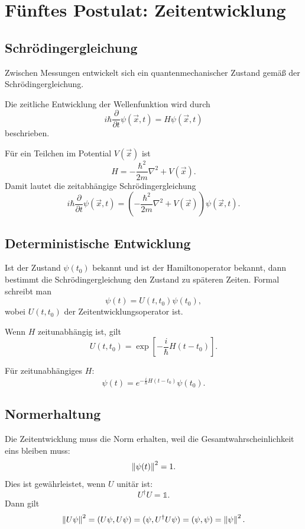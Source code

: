 \section{Fünftes Postulat: Zeitentwicklung}

\subsection{Schrödingergleichung}

Zwischen Messungen entwickelt sich ein quantenmechanischer Zustand gemäß der Schrödingergleichung.

\begin{definitionbox}
Die zeitliche Entwicklung der Wellenfunktion wird durch
\[
    i\hbar\frac{\partial}{\partial t}\psi(\vec{x},t)=H\psi(\vec{x},t)
\]
beschrieben.
\end{definitionbox}

Für ein Teilchen im Potential $V(\vec{x})$ ist
\[
    H=-\frac{\hbar^2}{2m}\nabla^2+V(\vec{x}).
\]
Damit lautet die zeitabhängige Schrödingergleichung
\[
    i\hbar\frac{\partial}{\partial t}\psi(\vec{x},t)
    =\left(-\frac{\hbar^2}{2m}\nabla^2+V(\vec{x})\right)\psi(\vec{x},t).
\]

\subsection{Deterministische Entwicklung}

Ist der Zustand $\psi(t_0)$ bekannt und ist der Hamiltonoperator bekannt, dann bestimmt die Schrödingergleichung den Zustand zu späteren Zeiten. Formal schreibt man
\[
    \psi(t)=U(t,t_0)\psi(t_0),
\]
wobei $U(t,t_0)$ der Zeitentwicklungsoperator ist.

Wenn $H$ zeitunabhängig ist, gilt
\[
    U(t,t_0)=\exp\left[-\frac{i}{\hbar}H(t-t_0)\right].
\]

\begin{formulabox}
Für zeitunabhängiges $H$:
\[
    \psi(t)=e^{-\frac{i}{\hbar}H(t-t_0)}\psi(t_0).
\]
\end{formulabox}

\subsection{Normerhaltung}

Die Zeitentwicklung muss die Norm erhalten, weil die Gesamtwahrscheinlichkeit eins bleiben muss:
\[
    \left\lVert \psi(t) \right\rVert^2=1.
\]
Dies ist gewährleistet, wenn $U$ unitär ist:
\[
    U^\dagger U=\mathbb{1}.
\]
Dann gilt
\[
    \left\lVert U\psi \right\rVert^2=(U\psi,U\psi)=(\psi,U^\dagger U\psi)=(\psi,\psi)=\left\lVert \psi \right\rVert^2.
\]

